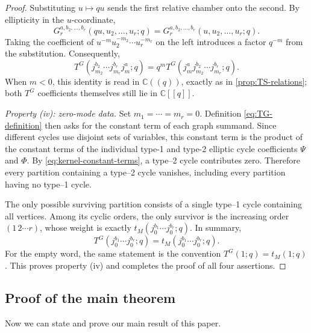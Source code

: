 \documentclass[11pt,a4paper]{amsart}
\numberwithin{equation}{section}
\theoremstyle{definition}
\theoremstyle{remark}
\newcommand{\CC}{\mathbb C}
\begin{document}
\begin{proof}
Substituting $u\mapsto qu$ sends the first relative chamber onto the second. By ellipticity in the $u$-coordinate,
\begin{equation*}
 G_r^{a,b_2,\ldots,b_r}(qu,u_2,\ldots,u_r;q)
 =G_r^{a,b_2,\ldots,b_r}(u,u_2,\ldots,u_r;q).
\end{equation*}
Taking the coefficient of $u^{-m}u_2^{-m_2}\cdots u_r^{-m_r}$ on the left introduces a factor $q^{-m}$ from the substitution. Consequently,
\begin{equation*}
 T^G(j_{m_2}^{b_2}\cdots j_{m_r}^{b_r}j_m^a;q)
 =q^mT^G(j_m^a j_{m_2}^{b_2}\cdots j_{m_r}^{b_r};q).
\end{equation*}
When $m<0$, this identity is read in $\CC((q))$, exactly as in
\cref{prop:TS-relations}; both $T^G$ coefficients themselves still lie in
$\CC[[q]]$.

\smallskip
\noindent\emph{Property (iv): zero-mode data.}
Set $m_1=\cdots=m_r=0$.  Definition \eqref{eq:TG-definition} then asks
for the constant term of each graph summand.  Since different cycles use disjoint sets of variables, this constant term is the product of the constant terms of the individual type-1 and type-2 elliptic cycle coefficients $\Psi$ and $\Phi$.  By \eqref{eq:kernel-constant-terms}, a type--2 cycle contributes zero. Therefore every partition containing a type--2 cycle vanishes, including every partition having no type--1 cycle.

The only possible surviving partition consists of a single type--1 cycle containing all vertices.  Among its cyclic orders, the only survivor is the increasing order $(1\,2\cdots r)$, whose weight is exactly $t_M(j_0^{b_1}\cdots j_0^{b_r};q)$. In summary,
\begin{equation*}
 T^G(j_0^{b_1}\cdots j_0^{b_r};q)
 =t_M(j_0^{b_1}\cdots j_0^{b_r};q).
\end{equation*}
For the empty word, the same statement is the convention
$T^G(1;q)=t_M(1;q)$.  This proves property (iv) and completes the proof of all four assertions.
\end{proof}

\subsection{Proof of the main theorem}
Now we can state and prove our main result of this paper.
\end{document}
